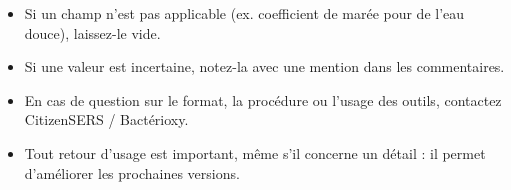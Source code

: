 \documentclass[12pt, a4paper]{article}
\begin{document}
\begin{enresume}
  \begin{itemize}
    \item Si un champ n'est pas applicable (ex. coefficient de marée
          pour de l'eau douce), laissez-le vide.
    \item Si une valeur est incertaine, notez-la avec une mention
          dans les commentaires.
    \item En cas de question sur le format, la procédure ou l'usage des
          outils, contactez CitizenSERS / Bactérioxy.
    \item Tout retour d'usage est important, même s'il concerne un détail :
          il permet d'améliorer les prochaines versions.
  \end{itemize}
\end{enresume}
\end{document}
